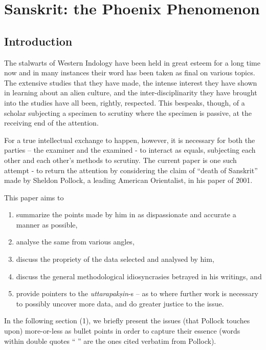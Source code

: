 \chapter{Sanskrit: the Phoenix Phenomenon}\label{chapter7}


\section*{Introduction}

The stalwarts of Western Indology have been held in great esteem for a long time now and in many instances their word has been taken as final on various topics. The extensive studies that they have made, the intense interest they have shown in learning about an alien culture, and the inter-disciplinarity they have brought into the studies have all been, rightly, respected. This bespeaks, though, of a scholar subjecting a specimen to scrutiny where the specimen is passive, at the receiving end of the attention. 

For a true intellectual exchange to happen, however, it is necessary for both the parties – the examiner and the examined - to interact as equals, subjecting each other and each other’s methods to scrutiny. The current paper is one such attempt  - to return the attention by considering the claim of “death of Sanskrit” made by Sheldon Pollock, a leading American Orientalist,  in his paper of 2001.

This paper aims to 
{\renewcommand\theenumi{\alph{enumi}}
\renewcommand\labelenumi{(\theenumi)}
\begin{enumerate}
\itemsep=0pt
\item summarize the points made by him in as dispassionate and accurate a manner as possible,
\item analyse the same from various angles,
\item discuss the propriety of the data selected and analysed by him,
\item discuss the general methodological idiosyncrasies betrayed in his writings, and 
\item provide pointers to the {\sl uttarapakṣin}-s – as to where further work is necessary to possibly uncover more data, and do greater justice to the issue.
\end{enumerate}}

In the following section (1), we briefly present the issues (that Pollock touches upon) more-or-less as bullet points in order to capture their essence (words within double quotes “ ” are the ones cited verbatim from Pollock). 

